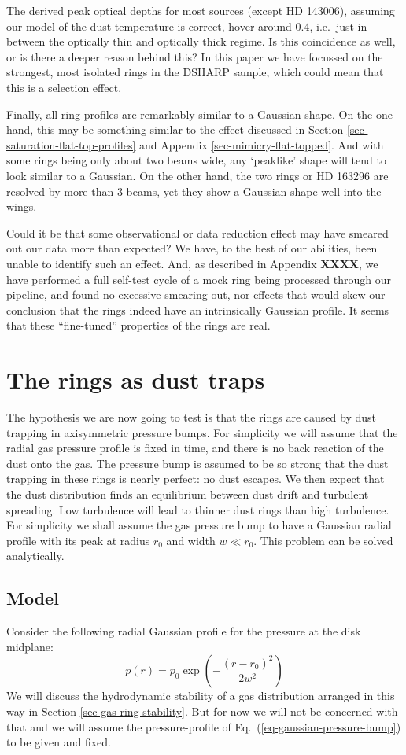 \documentclass{aa}
\begin{document}
The derived peak optical depths for most sources (except HD 143006), assuming
our model of the dust temperature is correct, hover around 0.4, i.e.\ just in
between the optically thin and optically thick regime. Is this coincidence as
well, or is there a deeper reason behind this? In this paper we have focussed on
the strongest, most isolated rings in the DSHARP sample, which could mean that
this is a selection effect.

Finally, all ring profiles are remarkably similar to a Gaussian shape. On the
one hand, this may be something similar to the effect discussed in Section
\ref{sec-saturation-flat-top-profiles} and Appendix
\ref{sec-mimicry-flat-topped}. And with some rings being only about two beams
wide, any `peaklike' shape will tend to look similar to a Gaussian. On the other
hand, the two rings or HD 163296 are resolved by more than 3 beams, yet they
show a Gaussian shape well into the wings.

Could it be that some observational or data reduction effect may have smeared
out our data more than expected? We have, to the best of our abilities, been
unable to identify such an effect. And, as described in Appendix {\bf XXXX}, we
have performed a full self-test cycle of a mock ring being processed through our
pipeline, and found no excessive smearing-out, nor effects that would skew our
conclusion that the rings indeed have an intrinsically Gaussian profile. It seems
that these ``fine-tuned'' properties of the rings are real. 

\section{The rings as dust traps}
\label{sec-rings-as-dust-traps}
%
The hypothesis we are now going to test is that the
rings are caused by dust trapping in axisymmetric pressure bumps. For simplicity
we will assume that the radial gas pressure profile is fixed in time, and there
is no back reaction of the dust onto the gas. The pressure bump is assumed to be
so strong that the dust trapping in these rings is nearly perfect: no dust
escapes. We then expect that the dust distribution finds an equilibrium between
dust drift and turbulent spreading. Low turbulence will lead to thinner dust
rings than high turbulence. For simplicity we shall assume the gas pressure bump
to have a Gaussian radial profile with its peak at radius $r_0$ and width $w\ll
r_0$. This problem can be solved analytically.

\subsection{Model}
\label{sec-model-dusttrap-rings}
%
Consider the following radial Gaussian profile for the
pressure at the disk midplane:
\begin{equation}\label{eq-gaussian-pressure-bump}
p(r) = p_0 \exp\left(-\frac{(r-r_0)^2}{2w^2}\right)
\end{equation}
We will discuss the hydrodynamic stability of a gas
distribution arranged in this way in Section \ref{sec-gas-ring-stability}. But
for now we will not be concerned with that and we will assume the
pressure-profile of Eq.~(\ref{eq-gaussian-pressure-bump}) to be given and fixed.
\end{document}
